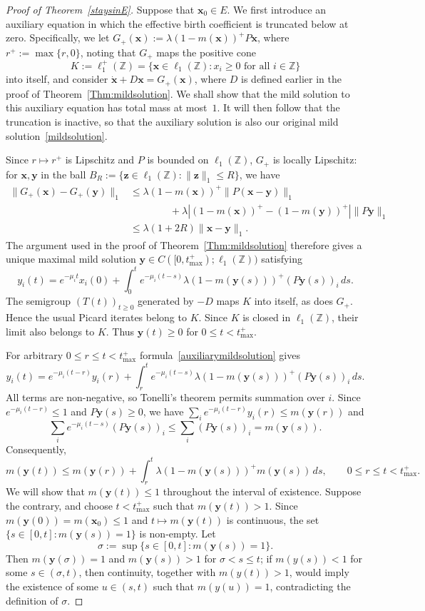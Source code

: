 \documentclass[12pt]{article}
\newcommand{\Z}{\ensuremath{\mathbb Z}}
\newcommand{\by}{\boldsymbol{y}}
\newcommand{\bz}{\boldsymbol{z}}
\newcommand{\BS}{\ensuremath{\ell_1(\Z)}}
\newcommand{\bx}{\boldsymbol{x}}
\begin{document}
\begin{proof}[Proof of Theorem~\ref{staysinE}]
Suppose that $\bx_0\in E$. We first introduce an auxiliary equation in
which the effective birth coefficient is truncated below at zero.
Specifically, we let $G_+(\bx):=\lambda(1-m(\bx))^+P\bx$, where
$r^+:=\max\{r,0\}$, 
noting that $G_+$ maps the positive cone 
$$
K:=\ell_1^+(\Z) = \{\bx\in\BS:x_i\geq 0\text{ for all }i\in\Z\}
$$
into itself, and consider $\dot{\bx}+D\bx=G_+(\bx)$, where $D$ is
defined earlier in the proof of Theorem~\ref{Thm:mildsolution}.
We shall show that the mild
solution to this auxiliary equation has total mass at most~$1$. It will
then follow that the truncation is inactive, so that the auxiliary
solution is also our original mild solution~\eqref{mildsolution}.

Since $r\mapsto r^+$ is Lipschitz and $P$ is bounded on
$\BS$, $G_+$ is locally Lipschitz:
for $\bx,\by$ in the ball 
$B_R:=\{\bz\in\BS:\|\bz\|_1\leq  R\}$, we have 
\begin{align*} 
\|G_+(\bx)-G_+(\by)\|_1 &\leq  \lambda (1-m(\bx))^+ \|P(\bx-\by)\|_1 \\ 
&\qquad\qquad +\lambda\left|(1-m(\bx))^+-(1-m(\by))^+\right| \|P\by\|_1
\\ &\leq  \lambda(1+2R)\|\bx-\by\|_1.
\end{align*}
The argument used in the proof of
Theorem~\ref{Thm:mildsolution} therefore gives a unique maximal mild
solution $\by\in C([0,t_{\max}^+);\BS)$ satisfying
\begin{equation}
y_i(t)=e^{-\mu_i t}x_i(0)
+\int_0^t e^{-\mu_i(t-s)}
\lambda(1-m(\by(s)))^+(P\by(s))_i\,ds.
\label{auxiliarymildsolution}
\end{equation}
The semigroup $(T(t))_{t\geq 0}$ generated by $-D$ maps $K$ into itself,
as does $G_+$. 
Hence the usual Picard iterates belong to $K$.
Since $K$ is
closed in $\BS$, their limit also belongs to $K$. Thus
$\by(t)\geq 0$ for $0\leq t<t_{\max}^+$.

For arbitrary $0\leq r\leq t<t_{\max}^+$ 
formula~\eqref{auxiliarymildsolution} gives
$$
y_i(t)=e^{-\mu_i(t-r)}y_i(r)
+\int_r^t e^{-\mu_i(t-s)}
\lambda(1-m(\by(s)))^+(P\by(s))_i\,ds.
$$
All terms are non-negative, so Tonelli's theorem permits summation over
$i$. Since $e^{-\mu_i(t-r)}\leq 1$ and $P\by(s)\geq 0$, we have
$\sum_i e^{-\mu_i(t-r)}y_i(r)\leq m(\by(r))$ and
$$
\sum_i e^{-\mu_i(t-s)}(P\by(s))_i
\leq\sum_i(P\by(s))_i=m(\by(s)).
$$
Consequently,
\begin{equation}
m(\by(t))
\leq m(\by(r))
+\int_r^t\lambda(1-m(\by(s)))^+m(\by(s))\,ds,
\qquad 0\leq r\leq t<t_{\max}^+.
\label{shiftedmassinequality}
\end{equation}
We will show that $m(\by(t))\leq1$ throughout the interval of existence.
Suppose the contrary, and choose $t<t_{\max}^+$ such that
$m(\by(t))>1$. Since $m(\by(0))=m(\bx_0)\leq 1$ and
$t\mapsto m(\by(t))$ is continuous, the set
$\{s\in[0,t]:m(\by(s))=1\}$ is non-empty. Let
$$
\sigma:=\sup\{s\in[0,t]:m(\by(s))=1\}.
$$
Then $m(\by(\sigma))=1$ and $m(\by(s))>1$ for $\sigma<s\leq t$; if
$m(y(s))<1$ for some $s\in(\sigma,t)$, then continuity, together
with $m(y(t))>1$, would imply the existence of some $u\in(s,t)$ such
that $m(y(u))=1$, contradicting the definition of $\sigma$.


\end{proof}
\end{document}
